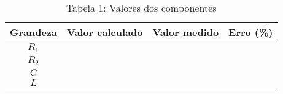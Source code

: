 \vspace{5pt}
\begin{table}[h]
\centering
\begin{tabular}{|c|c|c|c|}
\hline
\textbf{Grandeza} & \textbf{Valor calculado} & \textbf{Valor medido} & \textbf{Erro (\%) }\\\hline
$R_1$ & & & \\\hline
$R_2$ & & & \\\hline
$C$ & & & \\\hline
$L$ & & & \\\hline
\end{tabular}
\caption*{Tabela 1: Valores dos componentes}
\end{table}